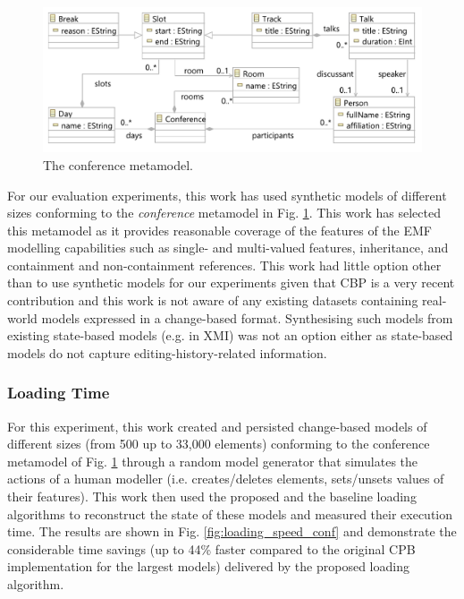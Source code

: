 \documentclass[12pt, a4paper]{report} \usepackage[titletoc]{appendix}
\begin{document}
\begin{figure}[htbp]
	\centering
	\includegraphics[width=0.9\linewidth]{conference_metamodel}
	\caption{The conference metamodel.}   
	\label{fig:node_metamodel}
\end{figure}

For our evaluation experiments, this work has used synthetic models of different sizes conforming to the \emph{conference} metamodel in Fig. \ref{fig:node_metamodel}. This work has selected this metamodel as it provides reasonable coverage of the features of the EMF modelling capabilities such as single- and multi-valued features, inheritance, and containment and non-containment references. This work had little option other than to use synthetic models for our experiments given that CBP is a very recent contribution and this work is not aware of any existing datasets containing real-world models expressed in a change-based format. Synthesising such models from existing state-based models (e.g. in XMI) was not an option either as state-based models do not capture editing-history-related information.    

\subsubsection{Loading Time}
\label{subsec:loading_time_test}

For this experiment, this work created and persisted change-based models of different sizes (from 500 up to 33,000 elements) conforming to the conference metamodel of Fig. \ref{fig:node_metamodel} through a random model generator that simulates the actions of a human modeller (i.e. creates/deletes elements, sets/unsets values of their features). This work then used the proposed and the baseline loading algorithms to reconstruct the state of these models and measured their execution time. The results are shown in Fig. \ref{fig:loading_speed_conf} and demonstrate the considerable time savings (up to 44\% faster compared to the original CPB implementation for the largest models) delivered by the proposed loading algorithm.
\end{document}
